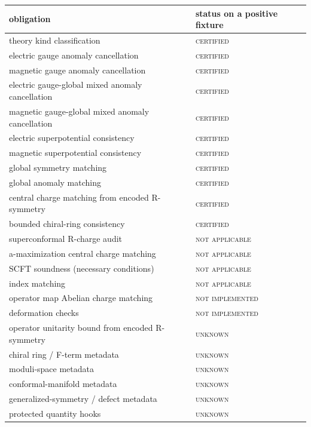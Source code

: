 \begin{tabular}{ll}
\toprule
obligation & status on a positive fixture \\
\midrule
theory kind classification & \textsc{certified} \\
electric gauge anomaly cancellation & \textsc{certified} \\
magnetic gauge anomaly cancellation & \textsc{certified} \\
electric gauge-global mixed anomaly cancellation & \textsc{certified} \\
magnetic gauge-global mixed anomaly cancellation & \textsc{certified} \\
electric superpotential consistency & \textsc{certified} \\
magnetic superpotential consistency & \textsc{certified} \\
global symmetry matching & \textsc{certified} \\
global anomaly matching & \textsc{certified} \\
central charge matching from encoded R-symmetry & \textsc{certified} \\
bounded chiral-ring consistency & \textsc{certified} \\
\midrule
superconformal R-charge audit & \textsc{not applicable} \\
a-maximization central charge matching & \textsc{not applicable} \\
SCFT soundness (necessary conditions) & \textsc{not applicable} \\
index matching & \textsc{not applicable} \\
\midrule
operator map Abelian charge matching & \textsc{not implemented} \\
deformation checks & \textsc{not implemented} \\
\midrule
operator unitarity bound from encoded R-symmetry & \textsc{unknown} \\
chiral ring / F-term metadata & \textsc{unknown} \\
moduli-space metadata & \textsc{unknown} \\
conformal-manifold metadata & \textsc{unknown} \\
generalized-symmetry / defect metadata & \textsc{unknown} \\
protected quantity hooks & \textsc{unknown} \\
\bottomrule
\end{tabular}
